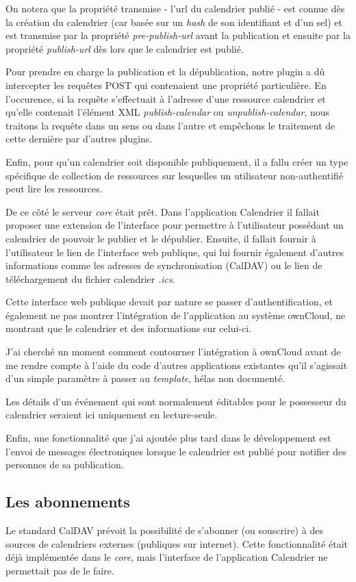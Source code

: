 \documentclass[10pt,a4paper]{report}
\begin{document}
	On notera que la propriété transmise - l'url du calendrier publié - est connue dès la création du calendrier (car basée sur un \textit{hash} de son identifiant et d'un sel) et est transmise par la propriété \textit{pre-publish-url} avant la publication et ensuite par la propriété \textit{publish-url} dès lors que le calendrier est publié.
	
	Pour prendre en charge la publication et la dépublication, notre plugin a dû intercepter les requêtes POST qui contenaient une propriété particulière.
	En l'occurence, si la requête s'effectuait à l'adresse d'une ressource calendrier et qu'elle contenait l'élément XML \textit{publish-calendar} ou \textit{unpublish-calendar}, nous traitons la requête dans un sens ou dans l'autre et empêchons le traitement de cette dernière par d'autres plugins.
	
	Enfin, pour qu'un calendrier soit disponible publiquement, il a fallu créer un type spécifique de collection de ressources sur lesquelles un utilisateur non-authentifié peut lire les ressources.
	
	De ce côté le serveur \textit{core} était prêt. Dans l'application Calendrier il fallait proposer une extension de l'interface pour permettre à l'utilisateur possédant un calendrier de pouvoir le publier et le dépublier. Ensuite, il fallait fournir à l'utilisateur le lien de l'interface web publique, qui lui fournir également d'autres informations comme les adresses de synchronisation (CalDAV) ou le lien de téléchargement du fichier calendrier \textit{.ics}.
	
	Cette interface web publique devait par nature se passer d'authentification, et également ne pas montrer l'intégration de l'application au système ownCloud, ne montrant que le calendrier et des informations sur celui-ci.
	
	J'ai cherché un moment comment contourner l'intégration à ownCloud avant de me rendre compte à l'aide du code d'autres applications existantes qu'il s'agissait d'un simple paramètre à passer au \textit{template}, hélas non documenté.
	
	Les détails d'un événement qui sont normalement éditables pour le possesseur du calendrier seraient ici uniquement en lecture-seule.
	
	Enfin, une fonctionnalité que j'ai ajoutée plus tard dans le développement est l'envoi de messages électroniques lorsque le calendrier est publié pour notifier des personnes de sa publication.
	
	\subsection{Les abonnements}
	Le standard CalDAV prévoit la possibilité de s'abonner (ou souscrire) à des sources de calendriers externes (publiques sur internet). Cette fonctionnalité était déjà implémentée dans le \textit{core}, mais l'interface de l'application Calendrier ne permettait pas de le faire. 
	
\end{document}
